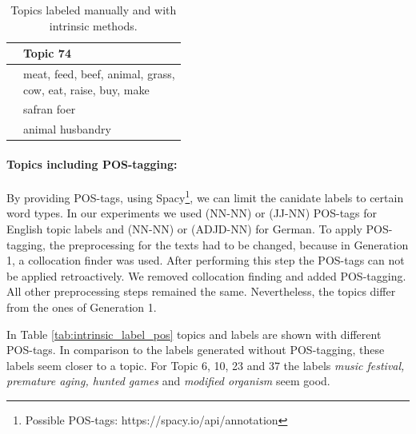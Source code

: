 {\begin{table}[h]
\begin{minipage}[t]{0.5\textwidth}
	\end{minipage}
	\begin{minipage}[t]{0.5\textwidth}
		\begin{tabular}{c|l}
			&Topic 74 \\
			\hline
			&\thead{meat, feed, beef, animal, grass,\\cow, eat, raise, buy, make} \\
			\hline
			&safran foer\\
			&animal husbandry	\\
		\end{tabular}
	\end{minipage}
	\caption[Labeled topics manually and with intrinsic method and ]{Topics labeled manually and with intrinsic methods.}
	\label{tab:extrinsic_manually}
\end{table}

\paragraph{Topics including POS-tagging:}

By providing \ac{POS}-tags, using Spacy\footnote{Possible POS-tags: https://spacy.io/api/annotation}, we can limit the canidate labels to certain word types. In our experiments we used (NN-NN) or (JJ-NN) \ac{POS}-tags for English topic labels and (NN-NN) or (ADJD-NN) for German.  To apply \ac{POS}-tagging, the preprocessing for the texts had to be changed, because in Generation 1, a collocation finder was used. After performing this step the \ac{POS}-tags can not be applied retroactively. We removed collocation finding and added \ac{POS}-tagging. All other preprocessing steps remained the same. Nevertheless, the topics differ from the ones of Generation 1. 

In Table \ref{tab:intrinsic_label_pos} topics and labels are shown with different \ac{POS}-tags. In comparison to the labels generated without \ac{POS}-tagging, these labels seem closer to a topic. For Topic 6, 10, 23 and 37 the labels \textit{music festival, premature aging, hunted games} and \textit{modified organism} seem good.

}
